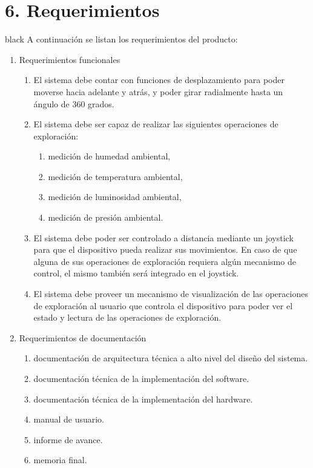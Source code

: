 \documentclass[
11pt, %
]{charter}
\begin{document}
\section{6. Requerimientos}
\label{sec:requerimientos}
\begin{consigna}{black}
A continuación se listan los requerimientos del producto:
\begin{enumerate}	
	\item Requerimientos funcionales		
	\begin{enumerate}			
		\item El sistema debe contar con funciones de desplazamiento para poder moverse hacia adelante y atrás, y poder girar radialmente hasta un ángulo de 360 grados.			
		\item El sistema debe ser capaz de realizar las siguientes operaciones de exploración:			
			\begin{enumerate}				
				\item medición de humedad ambiental,				
				\item medición de temperatura ambiental,				
				\item medición de luminosidad ambiental,				
				\item medición de presión ambiental.			
			\end{enumerate}			
		\item El sistema debe poder ser controlado a distancia mediante un joystick para que el dispositivo pueda realizar sus movimientos. En caso de que alguna de sus operaciones de exploración requiera algún mecanismo de control, el mismo también será integrado en el joystick.		
		\item El sistema debe proveer un mecanismo de visualización de las operaciones de exploración al usuario que controla el dispositivo para poder ver el estado y lectura de las operaciones de exploración.		
		\end{enumerate}	
	\item Requerimientos de documentación		
		\begin{enumerate}			
			\item documentación de arquitectura técnica a alto nivel del diseño del sistema.			
			\item documentación técnica de la implementación del software.			
			\item documentación técnica de la implementación del hardware.			
			\item manual de usuario.	
			\item informe de avance.
			\item memoria final.	

\end{enumerate}
\end{enumerate}
\end{consigna}
\end{document}
